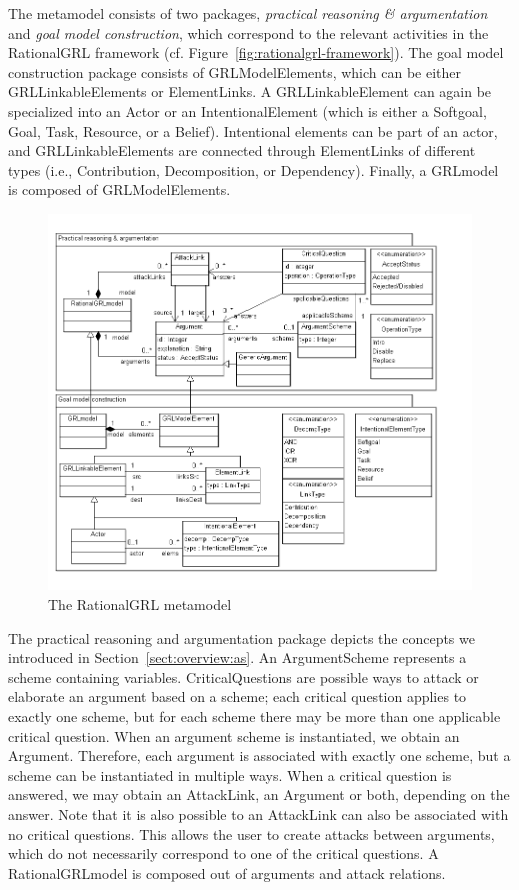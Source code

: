 The metamodel consists of two packages, \emph{practical reasoning \& argumentation} and \emph{goal model construction}, which correspond to the relevant activities in the RationalGRL framework (cf. Figure~\ref{fig:rationalgrl-framework}). The goal model construction package consists of \textsf{GRLModelElements}, which can be either \textsf{GRLLinkableElements} or \textsf{ElementLinks}. A \textsf{GRLLinkableElement} can again be specialized into an \textsf{Actor} or an \textsf{IntentionalElement} (which is either a \textsf{Softgoal}, \textsf{Goal}, \textsf{Task}, \textsf{Resource}, or a \textsf{Belief}). Intentional elements can be part of an actor, and \textsf{GRLLinkableElements} are connected through \textsf{ElementLinks} of different types (i.e., \textsf{Contribution, Decomposition}, or \textsf{Dependency}). Finally, a \textsf{GRLmodel} is composed of \textsf{GRLModelElements}.

\begin{figure}[t]
\includegraphics[width=\textwidth]{metamodel/metamodel}
\caption{The RationalGRL metamodel}
\label{fig:metamodel}
\end{figure}

The practical reasoning and argumentation package depicts the concepts we introduced in Section~\ref{sect:overview:as}. An \textsf{ArgumentScheme} represents a scheme containing variables. \textsf{CriticalQuestions} are possible ways to attack or elaborate an argument based on a scheme; each critical question applies to exactly one scheme, but for each scheme there may be more than one applicable critical question. When an argument scheme is instantiated, we obtain an \textsf{Argument}. Therefore, each argument is associated with exactly one scheme, but a scheme can be instantiated in multiple ways. When a critical question is answered, we may obtain an \textsf{AttackLink}, an \textsf{Argument} or both, depending on the answer. Note that it is also possible to an \textsf{AttackLink} can also be associated with no critical questions. This allows the user to create attacks between arguments, which do not necessarily correspond to one of the critical questions. A \textsf{RationalGRLmodel} is composed out of arguments and attack relations.

